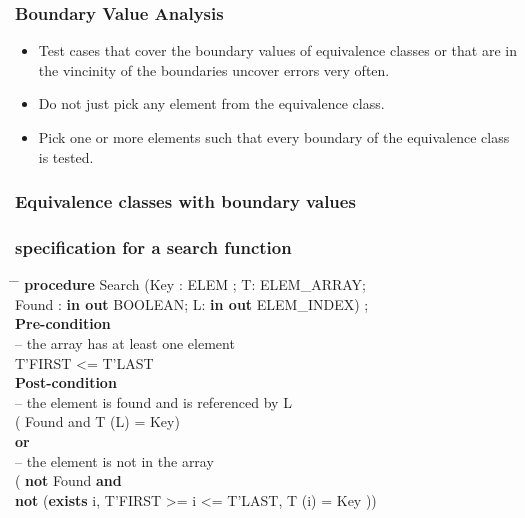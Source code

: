 


\begin{frame}
\frametitle{Boundary Value Analysis}
\begin{itemize}
  \item Test cases that cover the boundary values of equivalence classes or that are in the vincinity of the boundaries uncover errors very often.
  \item Do not just pick any element from the equivalence class.
  \item Pick one or more elements such that every boundary of the equivalence class is tested.
\end{itemize}
\end{frame}


\begin{frame}
\frametitle{Equivalence classes with boundary values}
\begin{center}
\end{center}
\end{frame}


\begin{frame}
\frametitle{specification for a search function}
\begin{tabbing}
\hspace*{2em} \= \hspace{2em} \= \kill
\textbf{procedure} Search (Key : ELEM ; T: ELEM\_ARRAY;\\
\> Found : \textbf{in out} BOOLEAN; L: \textbf{in out} ELEM\_INDEX) ;\\[1 em]
\textbf{Pre-condition}\\
\> \> -- the array has at least one element\\
\> \> T'FIRST <= T'LAST\\
\textbf{Post-condition}\\
\> \> -- the element is found and is referenced by L\\
\> \> ( Found and T (L) = Key) \\
\> \> \textbf{or}\\
\> \> -- the element is not in the array\\
\> \> ( \textbf{not} Found \textbf{and} \\
\> \> \textbf{not} (\textbf{exists} i, T'FIRST >= i <= T'LAST, T (i) = Key ))
\end{tabbing}
\end{frame}

